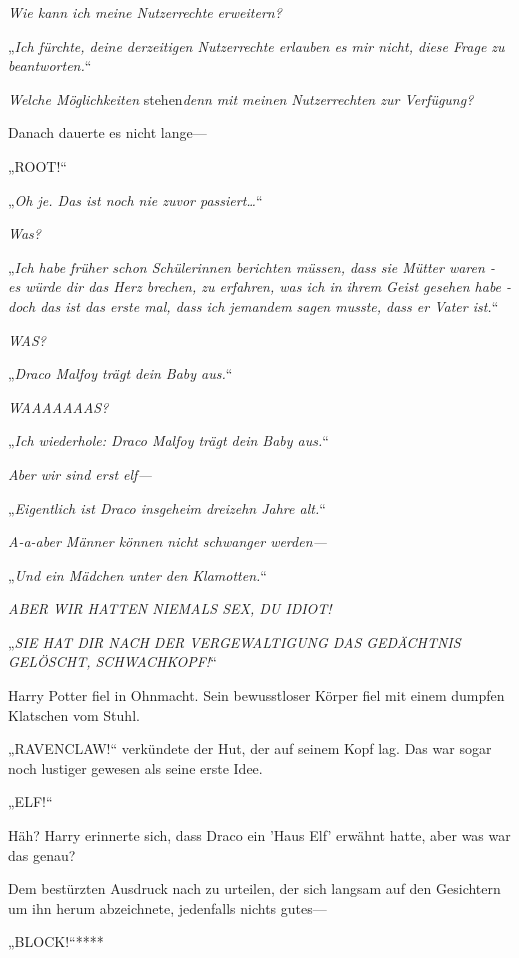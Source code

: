{\emph{Wie kann ich meine Nutzerrechte} \emph{erweitern?}

„\emph{Ich fürchte, deine derzeitigen Nutzerrechte erlauben es mir nicht, diese Frage zu beantworten.}“

\emph{Welche Möglichkeiten} stehen\emph{denn} \emph{mit meinen} \emph{Nutzerrechten zur Verfügung?}

Danach dauerte es nicht lange—

„ROOT!“

\later

„\emph{Oh je. Das ist noch nie zuvor passiert…}“

\emph{Was?}

„\emph{Ich habe früher schon Schülerinnen berichten müssen, dass sie Mütter waren - es würde dir das Herz brechen, zu erfahren, was ich in ihrem Geist gesehen habe - doch das ist das erste mal, dass ich jemandem sagen musste, dass er Vater ist.}“

\emph{WAS?}

„\emph{Draco Malfoy trägt dein Baby aus.}“

\emph{WAAAAAAAS?}

„\emph{Ich wiederhole: Draco Malfoy trägt dein Baby aus.}“

\emph{Aber wir sind erst elf—}

„\emph{Eigentlich ist Draco insgeheim dreizehn Jahre alt.}“

\emph{A-a-aber Männer können nicht schwanger werden—}

„\emph{Und ein Mädchen unter den Klamotten.}“

\emph{ABER WIR HATTEN NIEMALS SEX, DU IDIOT!}

„\emph{SIE HAT DIR NACH DER VERGEWALTIGUNG DAS GEDÄCHTNIS GELÖSCHT, SCHWACHKOPF!}“

Harry Potter fiel in Ohnmacht. Sein bewusstloser Körper fiel mit einem dumpfen Klatschen vom Stuhl.

„RAVENCLAW!“ verkündete der Hut, der auf seinem Kopf lag. Das war sogar noch lustiger gewesen als seine erste Idee.

\later

„ELF!“

Häh? Harry erinnerte sich, dass Draco ein 'Haus Elf' erwähnt hatte, aber was war das genau?

Dem bestürzten Ausdruck nach zu urteilen, der sich langsam auf den Gesichtern um ihn herum abzeichnete, jedenfalls nichts gutes—

\later

„BLOCK!“****

}
